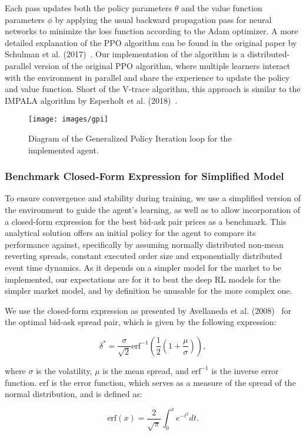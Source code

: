 Each pass updates both the policy parameters $\theta$ and the value function parameters $\phi$
by applying the usual backward propagation pass for neural networks to minimize the loss function according to the Adam optimizer.
A more detailed explanation of the PPO algorithm can be found in the original paper by Schulman et al. (2017)~\cite{Schulman2017}.
Our implementation of the algorithm is a distributed-parallel version of the original PPO algorithm,
where multiple learners interact with the environment in parallel and share the experience to update the policy and value function.
Short of the V-trace algorithm, this approach is similar to the IMPALA algorithm by Esperholt et al. (2018)~\cite{Espeholt2018}.

\begin{figure}[H]
    \centering
    \texttt{[image: images/gpi]}
    \caption{Diagram of the Generalized Policy Iteration loop for the implemented agent.}
    \label{fig:gpi}
\end{figure}

\subsubsection{Benchmark Closed-Form Expression for Simplified Model}
To ensure convergence and stability during training, we use a simplified version of the environment to guide the agent's learning,
as well as to allow incorporation of a closed-form expression for the best bid-ask pair prices as a benchmark.
This analytical solution offers an initial policy for the agent to compare its performance against,
specifically by assuming normally distributed non-mean reverting spreads, constant executed order size and exponentially distributed event time dynamics.
As it depends on a simpler model for the market to be implemented, our expectations are for it to beat the deep RL models for the simpler market model,
and by definition be unusable for the more complex one.

We use the closed-form expression as presented by Avellaneda et al. (2008)~\cite{Avellaneda2008} for the optimal bid-ask spread pair,
which is given by the following expression:

\[
    \delta^* = \frac{\sigma}{\sqrt{2}} \text{erf}^{-1} \left( \frac{1}{2} \left( 1 + \frac{\mu}{\sigma} \right) \right),
\]

where $\sigma$ is the volatility, $\mu$ is the mean spread, and $\text{erf}^{-1}$ is the inverse error function.
erf is the error function, which serves as a measure of the spread of the normal distribution, and is defined as:

\[
    \text{erf}(x) = \frac{2}{\sqrt{\pi}} \int_{0}^{x} e^{-t^2} dt.
\]

